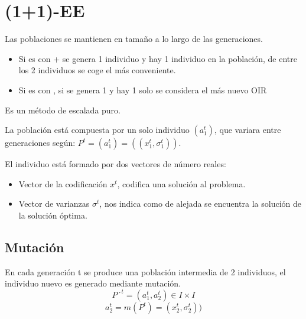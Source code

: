 \documentclass[12pt, twoside, openright]{report} %
\begin{document}
\section{(1+1)-EE}
Las poblaciones se mantienen en tamaño a lo largo de las generaciones.
\begin{itemize}
	\item Si es con + se genera 1 individuo y hay 1 individuo en la población, de entre los 2 individuos se coge el más conveniente.
	\item Si es con , si se genera 1 y hay 1 solo se considera el más nuevo OIR
\end{itemize}
Es un método de escalada puro.

La población está compuesta por un solo individuo $(a_1^t)$, que variara entre generaciones según: $P^t=(a^t_1)=((x^t_1, \sigma^t_1))$.

El individuo está formado por dos vectores de número reales: 
\begin{itemize}
	\item Vector de la codificación $x^t$, codifica una solución al problema.
	\item Vector de varianzas $\sigma^t$, nos indica como de alejada se encuentra la solución de la solución óptima.
\end{itemize}

\subsection{Mutación}
En cada generación t se produce una población intermedia de 2 individuos, el individuo nuevo es generado  mediante mutación.
$$P´^t=(a^t_1,a^t_2)\in I \times I$$
$$a^t_2=m(P^t)=(x^t_2, \sigma^t_2))$$
\end{document}
